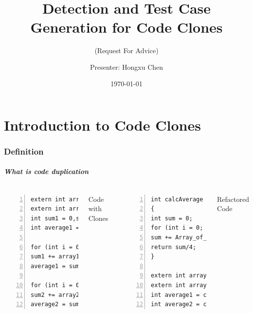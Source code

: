 \documentclass[pdf]{beamer}
\title[Clones]{Detection and Test Case Generation for Code Clones}
\subtitle{(Request For Advice)}
\author{Presenter: Hongxu Chen}
\date[\today]{\today}
\begin{document}
\frame{\titlepage}

\part{Introduction to Code Clones}
\frame{\partpage}
\section{Definition}

\begin{frame}[containsverbatim]
\frametitle{What is code duplication}
\centering{}
\vskip18pt
\begin{columns}
{{\tiny{
\begin{lstlisting}[language={[ANSI]C}, numbers=left,
numberstyle=\tiny,frame=none]
extern int array1[];
extern int array2[];
int sum1 = 0,sum2 = 0;
int average1 = 0,average2 = 0;

for (int i = 0; i < 4; i++)
sum1 += array1[i];
average1 = sum1/4;

for (int i = 0; i < 4; i++)
sum2 += array2[i];
average2 = sum2/4;
\end{lstlisting}
}}
\vskip11pt
Code with Clones}
{\tiny{
\begin{lstlisting}[language={[ANSI]C}, numbers=left,
numberstyle=\tiny]
int calcAverage (int* Array_of_4)
{
int sum = 0;
for (int i = 0; i < 4; i++)
sum += Array_of_4[i];
return sum/4;
}

extern int array1[];
extern int array2[];
int average1 = calcAverage(array1);
int average2 = calcAverage(array2);
\end{lstlisting}
}}
\vskip11pt
Refactored Code
\end{columns}
\end{frame}
\end{document}
